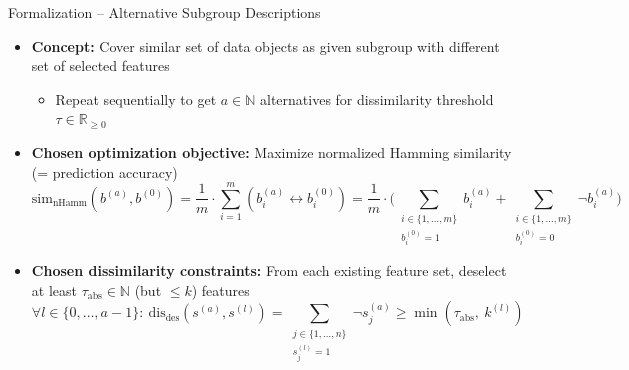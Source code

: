 \documentclass[en, navbaroff, handout]{sdqbeamer}
\begin{document}
\begin{frame}[t]{Formalization -- Alternative Subgroup Descriptions}
	\begin{itemize}
		\item \textbf{Concept:} Cover similar set of data objects as given subgroup with different set of selected features
		\begin{itemize}
			\item Repeat sequentially to get $a \in \mathbb{N}$ alternatives for dissimilarity threshold~$\tau \in \mathbb{R}_{\geq 0}$
		\end{itemize}
		\vspace{\baselineskip}
		\item \textbf{Chosen optimization objective:} Maximize normalized Hamming similarity (= prediction accuracy)
		\begin{equation*}
			\text{sim}_{\text{nHamm}}(b^{(a)}, b^{(0)}) = \frac{1}{m} \cdot \sum_{i=1}^m \left( b_i^{(a)} \leftrightarrow b_i^{(0)} \right) = \frac{1}{m} \cdot \Big( \sum\limits_{\substack{i \in \{1, \dots, m\} \\ b_i^{(0)} = 1}} b_i^{(a)} + \sum\limits_{\substack{i \in \{1, \dots, m\} \\ b_i^{(0)} = 0}} \lnot b_i^{(a)} \Big)
		\end{equation*}
		\vspace{\baselineskip}
		\item \textbf{Chosen dissimilarity constraints:} From each existing feature set, deselect at least $\tau_{\text{abs}} \in \mathbb{N}$ (but $\leq k$) features
		\begin{equation*}
			\forall l \in \{0, \dots, a-1\}:~ \text{dis}_{\text{des}}(s^{(a)}, s^{(l)}) = \sum_{\substack{j \in \{1, \dots, n\} \\ s^{(l)}_j = 1}} \lnot s^{(a)}_j \geq \min \left( \tau_{\text{abs}},~k^{(l)} \right)
		\end{equation*}
	\end{itemize}
\end{frame}
\end{document}
